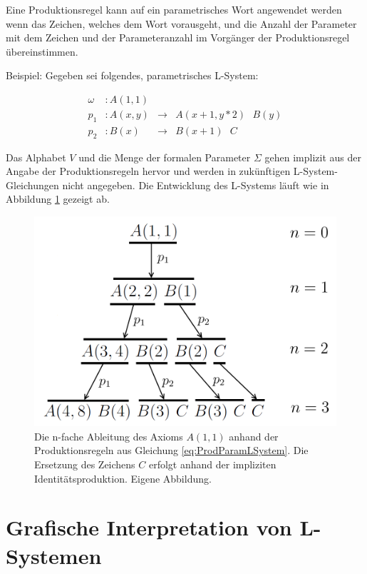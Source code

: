 Eine Produktionsregel kann auf ein parametrisches Wort angewendet werden wenn das Zeichen, welches dem Wort vorausgeht, und die Anzahl der Parameter mit dem Zeichen und der Parameteranzahl im Vorgänger der Produktionsregel übereinstimmen. \cite[S.42]{ABOP:04}

Beispiel: Gegeben sei folgendes, parametrisches L-System:

\begin{equation}
\begin{array}{llll}
\omega & : A(1,1) \\
p_1 & : A(x,y) &\rightarrow& A(x+1, y*2)\text{ }B(y) \\
p_2 &  : B(x) &\rightarrow& B(x+1)\text{ }C 
\end{array}
\label{eq:ProdParamLSystem}
\end{equation} 

Das Alphabet $V$ und die Menge der formalen Parameter $\Sigma$ gehen implizit aus der Angabe der Produktionsregeln hervor und werden in zukünftigen L-System-Gleichungen nicht angegeben. Die Entwicklung des L-Systems läuft wie in Abbildung \ref{fig:ParamLSystemBeispiel} gezeigt ab. 

\begin{figure} [hbtp]
	\centering
	\includegraphics[height=0.3\textheight]{images/ParamLSystemBeispiel.png}
	\caption{Die n-fache Ableitung des Axioms $A(1,1)$ anhand der Produktionsregeln aus Gleichung \ref{eq:ProdParamLSystem}. Die Ersetzung des Zeichens $C$ erfolgt anhand der impliziten Identitätsproduktion. Eigene Abbildung.}
	\label{fig:ParamLSystemBeispiel}
\end{figure}

\section{Grafische Interpretation von L-Systemen}

